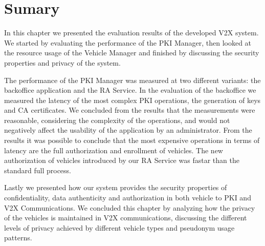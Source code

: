 			
			\section{Sumary}
			In this chapter we presented the evaluation results of the developed V2X system. We started by evaluating the performance of the PKI Manager, then looked at the resource usage of the Vehicle Manager and finished by discussing the security properties and privacy of the system.
			
			The performance of the PKI Manager was measured at two different variants: the backoffice application and the RA Service. In the evaluation of the backoffice we measured the latency of the most complex PKI operations, the generation of keys and CA certificates. We concluded from the results that the measurements were reasonable, considering the complexity of the operations, and would not negatively affect the usability of the application by an administrator. From the results it was possible to conclude that the most expensive operations in terms of latency are the full authorization and enrollment of vehicles. The new authorization of vehicles introduced by our RA Service was fastar than the standard full process. 
			
			Lastly we presented how our system provides the security properties of confidentiality, data authenticity and authorization in both vehicle to PKI and V2X Communications. We concluded this chapter by analyzing how the privacy of the vehicles is maintained in V2X communications, discussing the different levels of privacy achieved by different vehicle types and pseudonym usage patterns.
			
